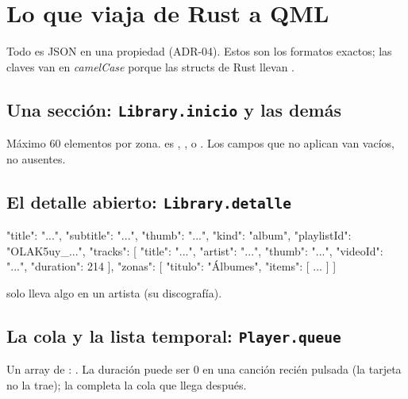 \section{Lo que viaja de Rust a QML}

Todo es JSON en una propiedad  (ADR-04). Estos son los formatos exactos; las
claves van en \emph{camelCase} porque las structs de Rust llevan
\cod{#[serde(rename_all = "camelCase")]}.

\subsection{Una sección: \texttt{Library.inicio} y las demás}

\begin{codigo}
\end{codigo}

Máximo 60 elementos por zona.  es , ,  o
. Los campos que no aplican van vacíos, no ausentes.

\subsection{El detalle abierto: \texttt{Library.detalle}}

\begin{codigo}
{ "title": "...", "subtitle": "...", "thumb": "...", "kind": "album", "playlistId": "OLAK5uy_...",
  "tracks": [ { "title": "...", "artist": "...", "thumb": "...", "videoId": "...", "duration": 214 } ],
  "zonas":  [ { "titulo": "Álbumes", "items": [ ... ] } ] }
\end{codigo}

 solo lleva algo en un artista (su discografía).

\subsection{La cola y la lista temporal: \texttt{Player.queue}}

Un array de : . La duración puede ser
0 en una canción recién pulsada (la tarjeta no la trae); la completa la cola que llega después.

